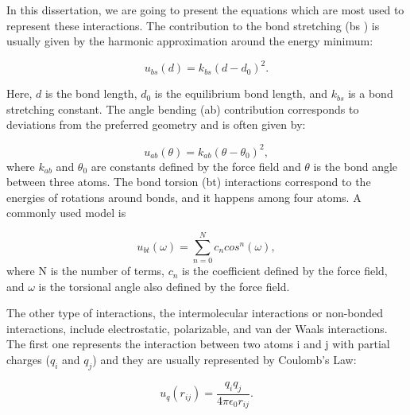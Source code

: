 In this dissertation, we are going to present the equations which are most used to represent these interactions. The contribution to the bond stretching (bs ) is usually given by the harmonic approximation around the energy minimum:

\begin{equation}
u_{bs}(d) = k_{bs} (d - d_{0})^2 .
\end{equation}

Here, $d$ is the bond length, $d_{0}$ is the equilibrium bond length, and $k_{bs}$ is a bond stretching constant. The angle bending (ab) contribution corresponds to deviations from the preferred geometry and is often given by:

\begin{equation}
u_{ab}(\theta) = k_{ab} (\theta - \theta _{0})^2,
\end{equation}
where $k_{ab}$ and $\theta _{0}$ are constants defined by the force field and $\theta$ is the bond angle between three atoms.  The bond torsion (bt) interactions correspond to the energies of rotations around bonds, and it happens among four atoms. A commonly used model is

\begin{equation}
u_{bt}(\omega) = \sum_{n=0}^{N}  c_{n} cos^{n} (\omega) ,
\end{equation}
where N is the number of terms, $c_{n}$ is the coefficient defined by the force field, and $\omega$ is the torsional angle also defined by the force field. 

The other type of interactions, the intermolecular interactions or non-bonded interactions, include electrostatic, polarizable, and van der Waals interactions. The first one represents the interaction between two atoms i and j with partial charges ($q_{i}$ and $q_{j}$) and they are usually represented by Coulomb's Law:

\begin{equation}
u_{q}(r_{ij}) = \frac{q_{i}q_{j}}{4 \pi \epsilon _{0} r_{ij}} .
\end{equation} 

